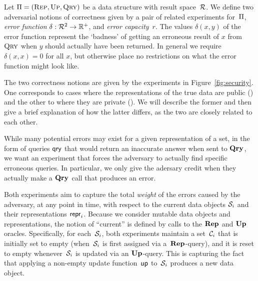 


Let $\mathrm{\Pi}=(\textnormal{\textsc{Rep}},\textnormal{\textsc{Up}},\textnormal{\textsc{Qry}})$ be a data structure with result space~$\mathcal{R}$.
%
We define two adversarial notions of correctness given by a pair of related
experiments for~$\mathrm{\Pi}$, \emph{error function} $\delta:\mathcal{R}^2 \to \mathbb{R}^+$,
and \emph{error capacity}~$r$. The values $\delta(x,y)$ of the error function represent
the `badness' of getting an erroneous result of $x$ from $\textnormal{\textsc{Qry}}$ when $y$ should
actually have been returned. In general we require $\delta(x,x) = 0$ for all
$x$, but otherwise place no restrictions on what the error function might look
like.

The two correctness notions are given by the experiments in
Figure~\ref{fig:security}. One corresponds to cases where the representations of
the true data are public (\errep) and the other to where they are private
(\erreps). We will describe the former and then give a brief explanation of how
the latter differs, as the two are closely related to each other.

While many potential errors may exist for a given representation of a set, in
the form of queries $\mathsf{qry}$ that would return an inaccurate answer when sent to
$\textup{\textbf{Qry}}\hspace{0.5pt}$, we want an experiment that forces the adversary to actually find
specific erroneous queries. In particular, we only give the adersary credit when
they actually make a $\textup{\textbf{Qry}}\hspace{0.5pt}$ call that produces an error.

Both experiments aim to capture the total \emph{weight} of the errors caused by the
adversary, at any point in time, with respect to the current data objects
$\mathcal{S}_i$ and their representations $\mathsf{repr}_i$.  Because we consider mutable data
objects and representations, the notion of ``current'' is defined by calls to
the $\textup{\textbf{Rep}}\hspace{0.5pt}$ and $\textup{\textbf{Up}}\hspace{0.5pt}$ oracles.  Specifically, for each~$\mathcal{S}_i$, both
experiments maintain a set~$\mathcal{C}_i$ that is initially set to empty
(when~$\mathcal{S}_i$ is first assigned via a~$\textup{\textbf{Rep}}\hspace{0.5pt}$-query), and it is reset to empty
whenever~$\mathcal{S}_i$ is updated via an $\textup{\textbf{Up}}\hspace{0.5pt}$-query.
%
%
This is capturing the fact that applying a non-empty update function~$\mathsf{up}$
to~$\mathcal{S}_i$ produces a new data object.

